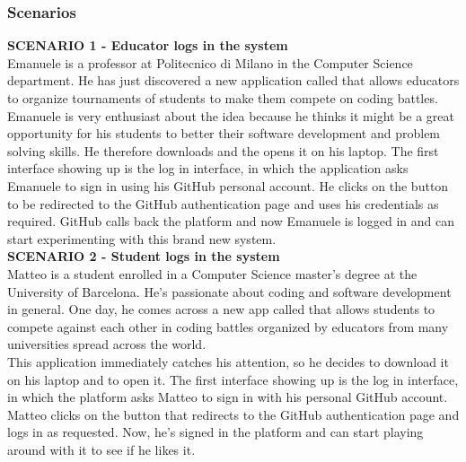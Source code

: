 \subsubsection{Scenarios}
\textbf{SCENARIO 1 - Educator logs in the system} \\
    Emanuele is a professor at Politecnico di Milano in the Computer Science department. He has just discovered a new application called \app that allows educators to organize tournaments of students to make them compete on coding battles.\\
    Emanuele is very enthusiast about the idea because he thinks it might be a great opportunity for his students to better their software development and problem solving skills. He therefore downloads \app and the opens it on his laptop. The first interface showing up is the log in interface, in which the application asks Emanuele to sign in using his GitHub personal account. He clicks on the button to be redirected to the GitHub authentication page and uses his credentials as required. GitHub calls back the \app platform and now Emanuele is logged in and can start experimenting with this brand new system.\\
    
    \textbf{SCENARIO 2 - Student logs in the system} \\
    Matteo is a student enrolled in a Computer Science master's degree at the University of Barcelona. He's passionate about coding and software development in general. One day, he comes across a new app called \app that allows students to compete against each other in coding battles organized by educators from many universities spread across the world.  \\
    This application immediately catches his attention, so he decides to download it on his laptop and to open it. The first interface showing up is the log in interface, in which the \app platform asks Matteo to sign in with his personal GitHub account. Matteo clicks on the button that redirects to the GitHub authentication page and logs in as requested.
    Now, he's signed in the platform and can start playing around with it to see if he likes it.\\
    
